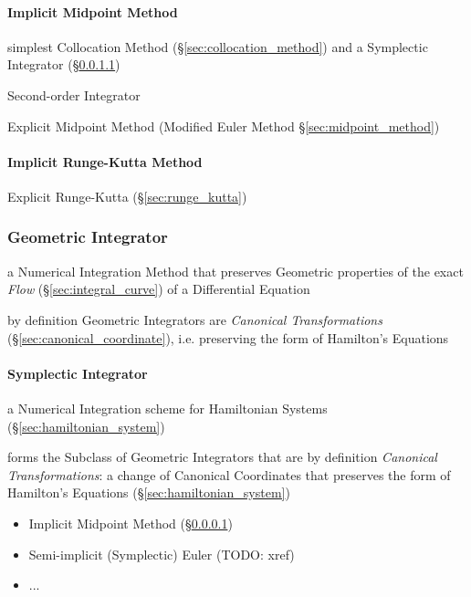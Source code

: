 {\paragraph{Implicit Midpoint Method}\label{sec:implicit_midpoint}\hfill

simplest Collocation Method (\S\ref{sec:collocation_method}) and
a Symplectic Integrator (\S\ref{sec:symplectic_integrator})

Second-order Integrator

\fist Explicit Midpoint Method (Modified Euler Method
\S\ref{sec:midpoint_method})



\paragraph{Implicit Runge-Kutta Method}\label{sec:implicit_runge_kutta}\hfill

\fist Explicit Runge-Kutta (\S\ref{sec:runge_kutta})



\subsubsection{Geometric Integrator}\label{sec:geometric_integrator}

a Numerical Integration Method that preserves Geometric properties of the exact
\emph{Flow} (\S\ref{sec:integral_curve}) of a Differential Equation

by definition Geometric Integrators are \emph{Canonical Transformations}
(\S\ref{sec:canonical_coordinate}), i.e. preserving the form of Hamilton's
Equations



\paragraph{Symplectic Integrator}\label{sec:symplectic_integrator}\hfill

a Numerical Integration scheme for Hamiltonian Systems
(\S\ref{sec:hamiltonian_system})

forms the Subclass of Geometric Integrators that are by definition
\emph{Canonical Transformations}: a change of Canonical Coordinates that
preserves the form of Hamilton's Equations (\S\ref{sec:hamiltonian_system})

\begin{itemize}
  \item Implicit Midpoint Method (\S\ref{sec:implicit_midpoint})
  \item Semi-implicit (Symplectic) Euler (TODO: xref)
  \item ...
\end{itemize}



}
